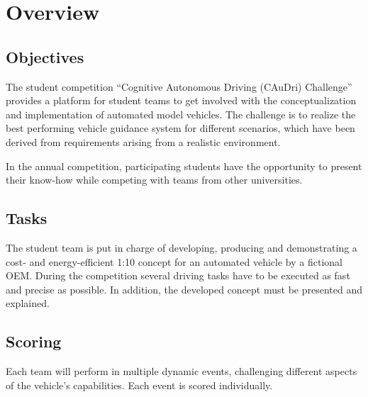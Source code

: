 \chapter{Overview}

\section{Objectives}

The student competition “Cognitive Autonomous Driving (CAuDri) Challenge”
provides a platform for student teams to get involved with the
conceptualization and implementation of automated model vehicles. The challenge
is to realize the best performing vehicle guidance system for different
scenarios, which have been derived from requirements arising from a realistic
environment.

In the annual competition, participating students have the opportunity to
present their know-how while competing with teams from other universities.

\section{Tasks}

The student team is put in charge of developing, producing and demonstrating a
cost- and energy-efficient 1:10 concept for an automated vehicle by a fictional
OEM. During the competition several driving tasks have to be executed as fast
and precise as possible. In addition, the developed concept must be presented
and explained.

\begin{highlight}
	\section{Scoring}

	Each team will perform in multiple dynamic events, challenging different
	aspects of the vehicle's capabilities. Each event is scored individually.
	\newline
\end{highlight}




